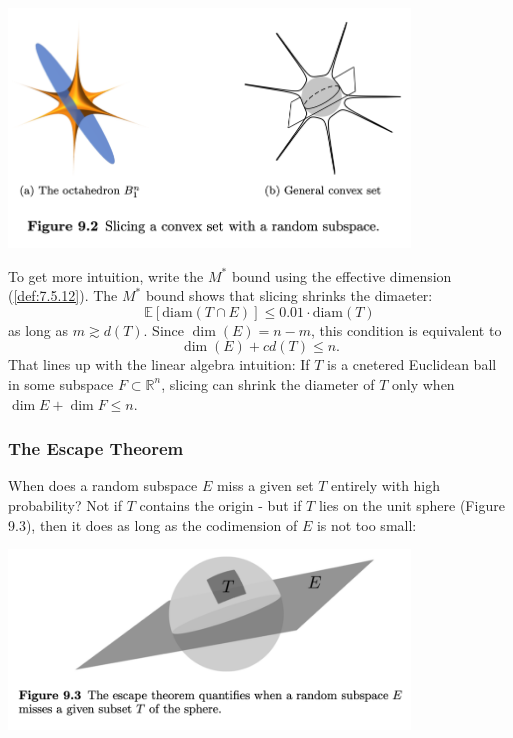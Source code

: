 \begin{center}
	\includegraphics[width=0.8\textwidth]{Chapter 9/fig9-2.png}
\end{center}

\begin{remark}
\label{rmk:9.3.3}
To get more intuition, write the $M^*$ bound using the effective dimension (\cref{def:7.5.12}). The $M^*$ bound 
shows that slicing shrinks the dimaeter:
\[ \mathbb{E}\left[ \mathrm{diam}(T \cap E) \right] \leq 0.01 \cdot \mathrm{diam}(T) \]
as long as $m \gtrsim d(T)$. Since $\dim{(E)} = n - m$, this condition is equivalent to 
\[ \dim{(E)} + cd(T) \leq n. \]
That lines up with the linear algebra intuition: If $T$ is a cnetered Euclidean ball in some subspace 
$F \subset \mathbb{R}^n$, slicing can shrink the diameter of $T$ only when $\dim{E} + \dim{F} \leq n$.
\end{remark}


\subsubsection{The Escape Theorem}
When does a random subspace $E$ miss a given set $T$ entirely with high probability? Not if $T$ contains the 
origin - but if $T$ lies on the unit sphere (Figure 9.3), then it does as long as the codimension of $E$ is not 
too small: 

\begin{center}
	\includegraphics[width=0.8\textwidth]{Chapter 9/fig9-3.png}
\end{center}

